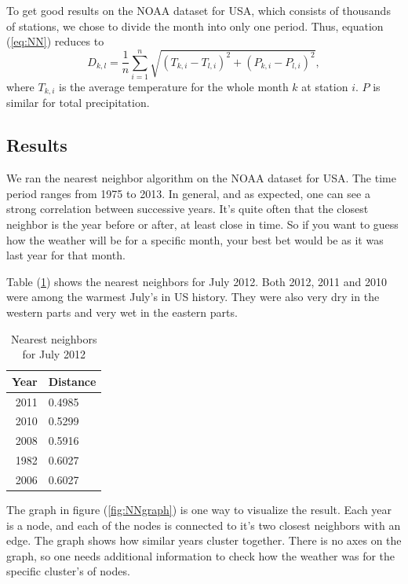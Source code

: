 To get good results on the NOAA dataset for USA, which consists of thousands 
of stations, we chose to divide the month into only one period. Thus, equation
(\ref{eq:NN}) reduces to
\begin{equation}
	\label{eq:NN_usa}
	D_{k,l} = \frac{1}{n}\sum_{i=1}^{n}{
	\sqrt{
		(T_{k,i} - T_{l,i})^2 + 
		(P_{k,i} - P_{l,i})^2
	}},
\end{equation}
where $T_{k,i}$ is the average temperature for the whole month $k$ at station $
i$. $P$ is similar for total precipitation. 


\subsection{Results} %

We ran the nearest neighbor algorithm on the NOAA dataset for USA. The time period
ranges from 1975 to 2013. In general, and as expected, one can see a strong correlation 
between successive years. It's quite often that the closest neighbor is the year before
or after, at least close in time. So if you want to guess how the weather will be for a
specific month, your best bet would be as it was last year for that month. 

Table (\ref{tab:NN_jul2012}) shows the nearest neighbors for July 2012. Both 2012, 2011 and
2010 were among the warmest July's in US history. They were also very dry in the western parts and
very wet in the eastern parts. 

\begin{table}[ht]
\centering
\caption{Nearest neighbors for July 2012}
\label{tab:NN_jul2012}
\vspace{0.5cm}
\begin{tabular}{rl}
  \hline
  Year & Distance \\ 
  \hline
  2011 & 0.4985 \\ 
  2010 & 0.5299 \\ 
  2008 & 0.5916 \\ 
  1982 & 0.6027 \\ 
  2006 & 0.6027 \\ 
  \hline
\end{tabular}
\end{table}

The graph in figure (\ref{fig:NNgraph}) is one way to visualize the result. Each year is a node, and each
of the nodes is connected to it's two closest neighbors with an edge. The graph shows
how similar years cluster together. There is no axes on the graph, so one needs additional
information to check how the weather was for the specific cluster's of nodes. 

